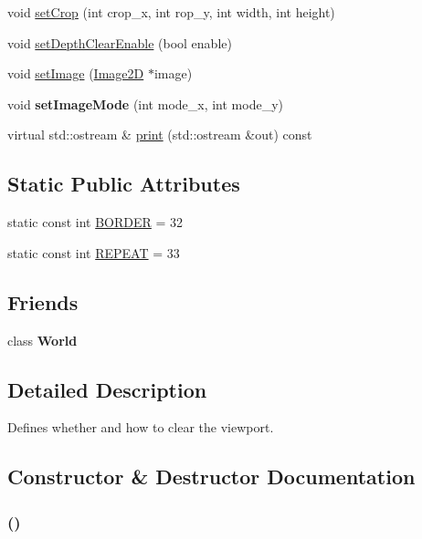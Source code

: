 \begin{CompactItemize}
\item 
void \hyperlink{classm3g_1_1Background_e543ac6196bbe65a7af8e6b8686441a7}{setCrop} (int crop\_\-x, int rop\_\-y, int width, int height)
\item 
void \hyperlink{classm3g_1_1Background_0953a713c22fd40cd586bcd8af80075a}{setDepthClearEnable} (bool enable)
\item 
void \hyperlink{classm3g_1_1Background_705b89b41cd1b38f664ed912be44baaa}{setImage} (\hyperlink{classm3g_1_1Image2D}{Image2D} $\ast$image)
\item 
\hypertarget{classm3g_1_1Background_aba37cb460a2376f1a4722eebb4de9a9}{
void \textbf{setImageMode} (int mode\_\-x, int mode\_\-y)}
\label{classm3g_1_1Background_aba37cb460a2376f1a4722eebb4de9a9}

\item 
virtual std::ostream \& \hyperlink{classm3g_1_1Background_6fea17fa1532df3794f8cb39cb4f911f}{print} (std::ostream \&out) const 
\end{CompactItemize}
\subsection*{Static Public Attributes}
\begin{CompactItemize}
\item 
static const int \hyperlink{classm3g_1_1Background_ee380e01b33e589c24984e4c4c1c6501}{BORDER} = 32
\item 
static const int \hyperlink{classm3g_1_1Background_a466d02b3d88f856854d0a0955be32e8}{REPEAT} = 33
\end{CompactItemize}
\subsection*{Friends}
\begin{CompactItemize}
\item 
\hypertarget{classm3g_1_1Background_7b4bcdf992c21ae83363f25df05b1d25}{
class \textbf{World}}
\label{classm3g_1_1Background_7b4bcdf992c21ae83363f25df05b1d25}

\end{CompactItemize}


\subsection{Detailed Description}
Defines whether and how to clear the viewport. 

\subsection{Constructor \& Destructor Documentation}
\hypertarget{classm3g_1_1Background_2bbc220bb63956558a8603a7909c2bbd}{
\subsubsection[{Background}]{ ()}}
\label{classm3g_1_1Background_2bbc220bb63956558a8603a7909c2bbd}


